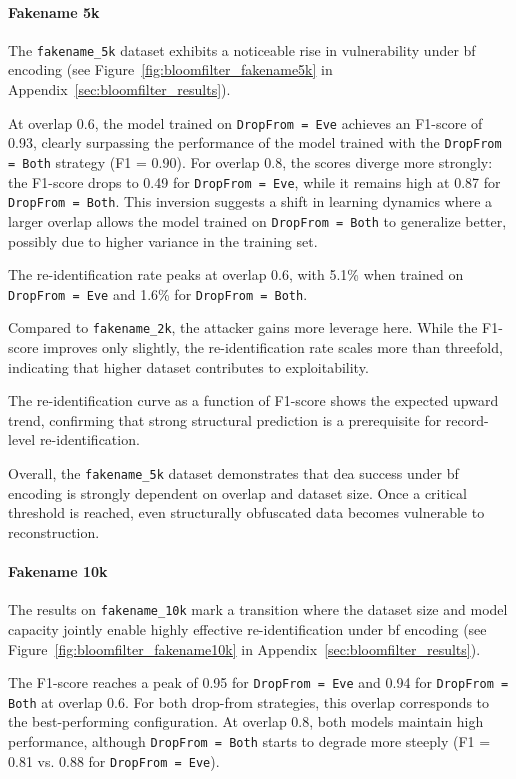 \paragraph{Fakename 5k}

The \texttt{fakename\_5k} dataset exhibits a noticeable rise in vulnerability under \ac{bf} encoding (see Figure~\ref{fig:bloomfilter_fakename5k} in Appendix~\ref{sec:bloomfilter_results}).

At overlap 0.6, the model trained on \texttt{DropFrom = Eve}  achieves an F1-score of 0.93, clearly surpassing the performance of the model trained with the \texttt{DropFrom = Both} strategy (F1 = 0.90).
For overlap 0.8, the scores diverge more strongly: the F1-score drops to 0.49 for \texttt{DropFrom = Eve}, while it remains high at 0.87 for \texttt{DropFrom = Both}.
This inversion suggests a shift in learning dynamics where a larger overlap allows the model trained on \texttt{DropFrom = Both} to generalize better, possibly due to higher variance in the training set.

The re-identification rate peaks at overlap 0.6, with 5.1\% when trained on \texttt{DropFrom = Eve} and 1.6\% for \texttt{DropFrom = Both}.

Compared to \texttt{fakename\_2k}, the attacker gains more leverage here.
While the F1-score improves only slightly, the re-identification rate scales more than threefold, indicating that higher dataset contributes to exploitability.

The re-identification curve as a function of F1-score shows the expected upward trend, confirming that strong structural prediction is a prerequisite for record-level re-identification.

Overall, the \texttt{fakename\_5k} dataset demonstrates that \ac{dea} success under \ac{bf} encoding is strongly dependent on overlap and dataset size.
Once a critical threshold is reached, even structurally obfuscated data becomes vulnerable to reconstruction.

\paragraph{Fakename 10k}

The results on \texttt{fakename\_10k} mark a transition where the dataset size and model capacity jointly enable highly effective re-identification under \ac{bf} encoding (see Figure~\ref{fig:bloomfilter_fakename10k} in Appendix~\ref{sec:bloomfilter_results}).

The F1-score reaches a peak of 0.95 for \texttt{DropFrom = Eve} and 0.94 for \texttt{DropFrom = Both} at overlap 0.6.
For both drop-from strategies, this overlap corresponds to the best-performing configuration.
At overlap 0.8, both models maintain high performance, although \texttt{DropFrom = Both} starts to degrade more steeply (F1 = 0.81 vs. 0.88 for \texttt{DropFrom = Eve}).

